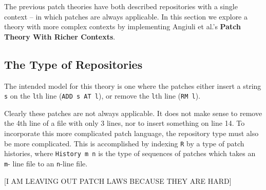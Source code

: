 The previous patch theories have both described repositories with a single context --
in which patches are always applicable. In this section we explore a theory with more
complex contexts by implementing Angiuli et al.'s \textbf{Patch Theory With Richer Contexts}.

\subsection{The Type of Repositories}
The intended model for this theory is one where the patches either insert a string \texttt{s} on the
\texttt{l}th line (\texttt{ADD s AT l}), or remove the \texttt{l}th line (\texttt{RM l}).

Clearly these patches are not always applicable. It does not make sense to remove the 4th line of a file
with only 3 lines, nor to insert something on line 14. To incorporate this more complicated patch language,
the repository type must also be more complicated. This is accomplished by indexing \texttt{R} by a type
of patch histories, where \texttt{History m n} is the type of sequences of patches which takes an \texttt{m}-
line file to an \texttt{n}-line file.

[I AM LEAVING OUT PATCH LAWS BECAUSE THEY ARE HARD]

